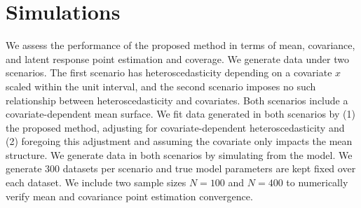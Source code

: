\documentclass[useAMS,referee,usenatbib]{biom}
\begin{document}
\section{Simulations}
\label{s:simulation}
\iffalse Analytic posterior distributions are intractable, so we rely on Markov-Chain Monte-Carlo techniques to draw samples from all relevant posterior distributions. Since all full conditionals of blocks of parameters are available in closed form, a simple Gibbs sampler updates each parameter block sequentially. See Web Appendix A for all block parameter updating steps.


\fi 
We assess the performance of the proposed method in terms of mean, covariance, and latent response point estimation and coverage. We generate data under two scenarios. The first scenario has heteroscedasticity depending on a covariate $x$ scaled within the unit interval, and the second scenario imposes no such relationship between heteroscedasticity and covariates. Both scenarios include a covariate-dependent mean surface. We fit data generated in both scenarios by (1) the proposed method, adjusting for covariate-dependent heteroscedasticity and (2) foregoing this adjustment and assuming the covariate only impacts the mean structure. We generate data in both scenarios by simulating from the model. We generate 300 datasets per scenario and true model parameters are kept fixed over each dataset. We include two sample sizes $N=100$ and $N=400$ to numerically verify mean and covariance point estimation convergence. 
\end{document}
